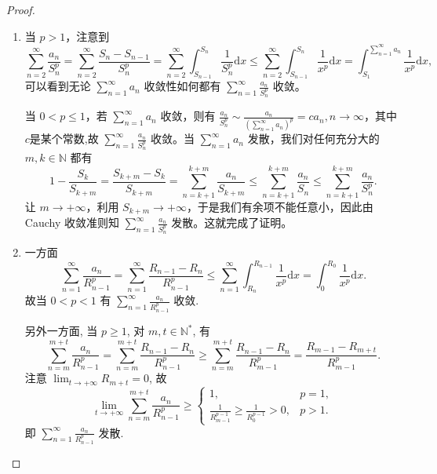 \documentclass[../../main.tex]{subfiles}
\begin{document}
\begin{proof}
\begin{enumerate}
\item 当 \( p > 1 \)，注意到
\[
\sum_{n = 2}^{\infty} \frac{a_n}{S_n^p} = \sum_{n = 2}^{\infty} \frac{S_n - S_{n - 1}}{S_n^p} = \sum_{n = 2}^{\infty} \int_{S_{n - 1}}^{S_n} \frac{1}{S_n^p} \mathrm{d}x \leqslant \sum_{n = 2}^{\infty} \int_{S_{n - 1}}^{S_n} \frac{1}{x^p} \mathrm{d}x = \int_{S_1}^{\sum\limits_{n = 1}^{\infty} a_n} \frac{1}{x^p} \mathrm{d}x,
\]
可以看到无论 \( \sum_{n = 1}^{\infty} a_n \) 收敛性如何都有 \( \sum_{n = 1}^{\infty} \frac{a_n}{S_n^p} \) 收敛。

当 \( 0 < p \leqslant 1 \)，若 \( \sum_{n = 1}^{\infty} a_n \) 收敛，则有 \( \frac{a_n}{S_n^p} \sim \frac{a_n}{\left( \sum\limits_{n = 1}^{\infty} a_n \right)^p}=ca_n, n \to \infty \)，其中$c$是某个常数,故 \( \sum_{n = 1}^{\infty} \frac{a_n}{S_n^p} \) 收敛。当 \( \sum_{n = 1}^{\infty} a_n \) 发散，我们对任何充分大的 \( m, k \in \mathbb{N} \) 都有
\[
1 - \frac{S_k}{S_{k + m}} = \frac{S_{k + m} - S_k}{S_{k + m}} = \sum_{n = k + 1}^{k + m} \frac{a_n}{S_{k + m}} \leqslant \sum_{n = k + 1}^{k + m} \frac{a_n}{S_n} \leqslant \sum_{n = k + 1}^{k + m} \frac{a_n}{S_n^p}.
\]
让 \( m \to +\infty \)，利用 \( S_{k + m} \to +\infty \)，于是我们有余项不能任意小，因此由 Cauchy 收敛准则知 \( \sum_{n = 1}^{\infty} \frac{a_n}{S_n^p} \) 发散。这就完成了证明。

\item 一方面
\[
\sum_{n=1}^{\infty} \frac{a_n}{R_{n-1}^p} = \sum_{n=1}^{\infty} \frac{R_{n-1} - R_n}{R_{n-1}^p} \leqslant \sum_{n=1}^{\infty} \int_{R_n}^{R_{n-1}} \frac{1}{x^p} \mathrm{d}x = \int_{0}^{R_0} \frac{1}{x^p} \mathrm{d}x.
\]
故当 \( 0 < p < 1 \) 有 \( \sum_{n=1}^{\infty} \frac{a_n}{R_{n-1}^p} \) 收敛.

另外一方面, 当 \( p \geqslant 1 \), 对 \( m,t \in \mathbb{N}^* \), 有
\[
\sum_{n=m}^{m+t} \frac{a_n}{R_{n-1}^p} = \sum_{n=m}^{m+t} \frac{R_{n-1} - R_n}{R_{n-1}^p} \geqslant \sum_{n=m}^{m+t} \frac{R_{n-1} - R_n}{R_{m-1}^p} = \frac{R_{m-1} - R_{m+t}}{R_{m-1}^p}.
\]
注意 \( \lim_{t \to +\infty} R_{m+t} = 0 \), 故
\[
\lim_{t \to +\infty} \sum_{n=m}^{m+t} \frac{a_n}{R_{n-1}^p} \geqslant \begin{cases}
1, & p = 1, \\
\frac{1}{R_{m-1}^{p-1}} \geqslant \frac{1}{R_0^{p-1}} > 0, & p > 1.
\end{cases}
\]
即 \( \sum_{n=1}^{\infty} \frac{a_n}{R_{n-1}^p} \) 发散.
\end{enumerate}

\end{proof}
\end{document}

